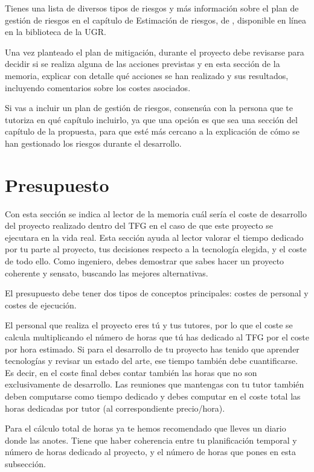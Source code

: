 Tienes una lista de diversos tipos de riesgos y más información sobre el plan de gestión de riesgos en el capítulo de Estimación de riesgos, de \cite{guerin2018gestion}, disponible en línea en la biblioteca de la UGR.

Una vez planteado el plan de mitigación, durante el proyecto debe revisarse para decidir si se realiza alguna de las acciones previstas y en esta sección de la memoria, explicar con detalle qué acciones se han realizado y sus resultados, incluyendo comentarios sobre los costes asociados.

Si vas a incluir un plan de gestión de riesgos, consensúa con la persona que te tutoriza en qué capítulo incluirlo, ya que una opción es que sea una sección del capítulo de la propuesta, para que esté más cercano a la explicación de  cómo se han gestionado los riesgos durante el desarrollo.

\section{Presupuesto}

Con esta sección se indica al lector de la memoria cuál sería el coste de desarrollo del proyecto realizado dentro del TFG en el caso de que este proyecto se ejecutara en la vida real. Esta sección ayuda al lector valorar el tiempo dedicado por tu parte al proyecto, tus decisiones respecto a la tecnología elegida, y el coste de todo ello. Como ingeniero, debes demostrar que sabes hacer un proyecto coherente  y sensato, buscando las mejores alternativas. 

El presupuesto debe tener dos tipos de conceptos principales: costes de personal y costes de ejecución.

El personal que realiza el proyecto eres tú y tus tutores, por lo que el coste se calcula multiplicando el número de horas que tú has dedicado al TFG por el coste por hora estimado. Si para el desarrollo de tu proyecto has tenido que aprender tecnologías y revisar un estado del arte, ese tiempo también debe cuantificarse. Es decir, en el coste final debes contar también las horas que no son exclusivamente de desarrollo. Las reuniones que mantengas con tu tutor también deben computarse como tiempo dedicado y debes computar en el coste total las horas dedicadas por tutor (al correspondiente precio/hora).

Para el cálculo total de horas ya te hemos recomendado que lleves un diario donde las anotes. Tiene que haber coherencia entre tu planificación temporal y número de horas dedicado al proyecto, y el número de horas que pones en esta subsección.

